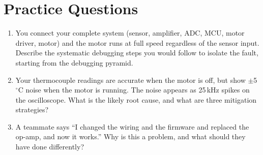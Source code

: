 \documentclass[11pt,letterpaper,twoside,openany]{book}
\newcommand{\degC}{\ensuremath{{}^{\circ}\text{C}}}
\begin{document}
\section{Practice Questions}
\begin{enumerate}[leftmargin=1.5em]
\item You connect your complete system (sensor, amplifier, ADC, MCU, motor driver, motor) and the motor runs at full speed regardless of the sensor input. Describe the systematic debugging steps you would follow to isolate the fault, starting from the debugging pyramid.
\item Your thermocouple readings are accurate when the motor is off, but show $\pm$5\,\degC{} noise when the motor is running. The noise appears as 25\,kHz spikes on the oscilloscope. What is the likely root cause, and what are three mitigation strategies?
\item A teammate says ``I changed the wiring and the firmware and replaced the op-amp, and now it works.'' Why is this a problem, and what should they have done differently?
\end{enumerate}
\end{document}
